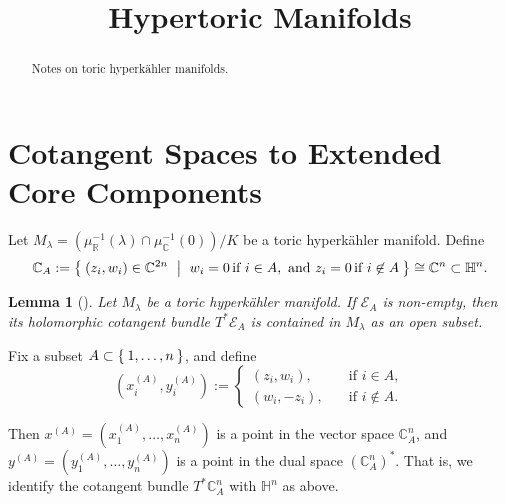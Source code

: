 \documentclass{article}
\title{Hypertoric Manifolds}
\date{}	%
\newtheorem{lemma}[theorem]{Lemma}
\newcommand{\HK}{hyperk\"ahler }
\newcommand{\RR}{\mathbb{R}}
\newcommand{\CC}{\mathbb{C}}
\newcommand{\HH}{\mathbb{H}}
\newcommand{\mcE}{\mathcal{E}}
\newcommand{\pbrackets}[1]{\left( #1 \right)}
\begin{document}
	\maketitle
	
	\begin{abstract}
		Notes on toric \HK manifolds.
	\end{abstract}
	
	\section{Cotangent Spaces to Extended Core Components}
	
	Let $M_{\lambda} = \pbrackets{\mu_{\RR}^{-1}(\lambda) \cap \mu_{\CC}^{-1}(0)}/K$ be a toric \HK manifold. Define
	\begin{equation*}
		\CC_{A} := \Set{ (z_{i}, w_{i}) \in \CC^{2n}\ | \ w_{i} = 0\, \text{if } i \in A, \text{ and } z_{i} = 0\, \text{if } i \not\in A } \cong \CC^{n} \subset \HH^{n}.
	\end{equation*}
	
	\begin{lemma}[\cite{Konno2002}]\label{cotangent:1}
		Let $M_{\lambda}$ be a toric \HK manifold. If $\mcE_{A}$ is non-empty, then its holomorphic cotangent bundle $T^{\ast}\mcE_{A}$ is contained in $M_{\lambda}$ as an open subset.
	\end{lemma}
	
	Fix a subset $A \subset \Set{1, \ldots, n}$, and define
	\begin{equation*}
		(x_{i}^{(A)}, y_{i}^{(A)}) :=
		\begin{cases}
			(z_{i}, w_{i}), \quad &\text{if } i \in A, \\
			(w_{i}, -z_{i}), \quad &\text{if } i \not\in A.
		\end{cases}
	\end{equation*}

	Then $x^{(A)} = (x_{1}^{(A)}, \ldots, x_{n}^{(A)})$ is a point in the vector space $\CC_{A}^{n}$, and $y^{(A)} = (y_{1}^{(A)}, \ldots, y_{n}^{(A)})$ is a point in the dual space $\pbrackets{\CC_{A}^{n}}^{\ast}$. That is, we identify the cotangent bundle $T^{\ast}\CC_{A}^{n}$ with $\HH^{n}$ as above.
	
\end{document}
